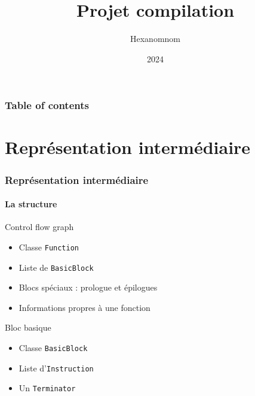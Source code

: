 \documentclass{beamer}
\title[Projet compilation]{Projet compilation}
\author[Hexanomnom]{Hexanomnom}
\institute[INSA Lyon]{INSA Lyon}
\date{2024}
\begin{document}
\frame{\titlepage}

\begin{frame}
    \frametitle{Table of contents}
    \tableofcontents
\end{frame}



\section{Représentation intermédiaire}

\begin{frame}
    \frametitle{Représentation intermédiaire}
    \framesubtitle{La structure}

    \begin{block}{Control flow graph}
        \begin{itemize}
            \item Classe \lstinline{Function}
            \item Liste de \lstinline{BasicBlock}
            \item Blocs spéciaux : prologue et épilogues
            \item Informations propres à une fonction
        \end{itemize}
    \end{block}
    \pause
    \begin{block}{Bloc basique}
        \begin{itemize}
            \item Classe \lstinline{BasicBlock}
            \item Liste d'\lstinline{Instruction}
            \item Un \lstinline{Terminator}
        \end{itemize}
    \end{block}
\end{frame}
\end{document}
